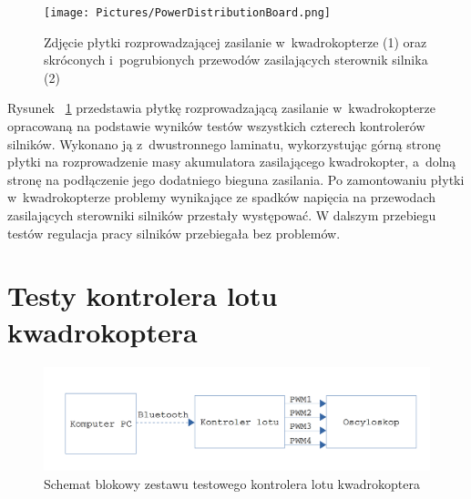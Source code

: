 \documentclass[11pt, twoside]{Thesis} %
\begin{document}
\begin{figure}[H]
	\centering
	\texttt{[image: Pictures/PowerDistributionBoard.png]}
	\caption[Zdjęcie płytki rozprowadzającej zasilanie w~kwadrokopterze (1) oraz skróconych i~pogrubionych przewodów zasilających sterownik silnika (2)]{Zdjęcie płytki rozprowadzającej zasilanie w~kwadrokopterze (1) oraz skróconych i~pogrubionych przewodów zasilających sterownik silnika (2)}
	\label{fig:PowerDistribudionBoard}
\end{figure}

Rysunek ~\ref{fig:PowerDistribudionBoard} przedstawia płytkę rozprowadzającą zasilanie w~kwadrokopterze opracowaną na podstawie wyników testów wszystkich czterech kontrolerów silników. Wykonano ją z~dwustronnego laminatu, wykorzystując górną stronę płytki na rozprowadzenie masy akumulatora zasilającego kwadrokopter, a~dolną stronę na podłączenie jego dodatniego bieguna zasilania. Po zamontowaniu płytki w~kwadrokopterze problemy wynikające ze spadków napięcia na przewodach zasilających sterowniki silników przestały występować. W dalszym przebiegu testów regulacja pracy silników przebiegała bez problemów.

\section{Testy kontrolera lotu kwadrokoptera}

\begin{figure}[H]
	\centering
	\includegraphics[scale=0.2]{Pictures/QuadrotorController_test.png}
	\caption[Schemat blokowy zestawu testowego kontrolera lotu kwadrokoptera]{Schemat blokowy zestawu testowego kontrolera lotu kwadrokoptera}
	\label{fig:QuadrotorController_test}
\end{figure}
\end{document}
